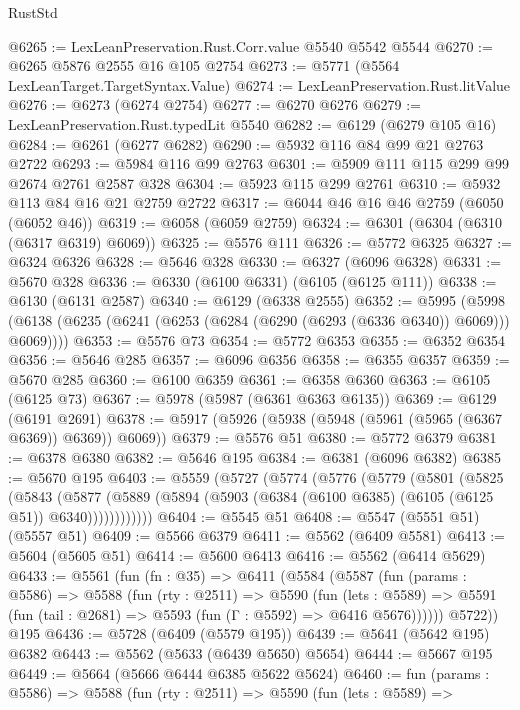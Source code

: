 \begin{lexlean}{RustStd}
\begin{coremodule}
{\begin{coremodule}
{{{{{{{{{{{{{{{{{{{{{{{{{{@6265 := LexLeanPreservation.Rust.Corr.value @5540 @5542 @5544
@6270 := @6265 @5876 @2555 @16 @105 @2754
@6273 := @5771 (@5564 LexLeanTarget.TargetSyntax.Value)
@6274 := LexLeanPreservation.Rust.litValue
@6276 := @6273 (@6274 @2754)
@6277 := @6270 @6276
@6279 := LexLeanPreservation.Rust.typedLit @5540
@6282 := @6129 (@6279 @105 @16)
@6284 := @6261 (@6277 @6282)
@6290 := @5932 @116 @84 @99 @21 @2763 @2722
@6293 := @5984 @116 @99 @2763
@6301 := @5909 @111 @115 @299 @99 @2674 @2761 @2587 @328
@6304 := @5923 @115 @299 @2761
@6310 := @5932 @113 @84 @16 @21 @2759 @2722
@6317 := @6044 @46 @16 @46 @2759 (@6050 (@6052 @46))
@6319 := @6058 (@6059 @2759)
@6324 := @6301 (@6304 (@6310 (@6317 @6319) @6069))
@6325 := @5576 @111
@6326 := @5772 @6325
@6327 := @6324 @6326
@6328 := @5646 @328
@6330 := @6327 (@6096 @6328)
@6331 := @5670 @328
@6336 := @6330 (@6100 @6331) (@6105 (@6125 @111))
@6338 := @6130 (@6131 @2587)
@6340 := @6129 (@6338 @2555)
@6352 := @5995
    (@5998 (@6138 (@6235 (@6241 (@6253 (@6284 (@6290 (@6293 (@6336 @6340)) @6069))) @6069))))
@6353 := @5576 @73
@6354 := @5772 @6353
@6355 := @6352 @6354
@6356 := @5646 @285
@6357 := @6096 @6356
@6358 := @6355 @6357
@6359 := @5670 @285
@6360 := @6100 @6359
@6361 := @6358 @6360
@6363 := @6105 (@6125 @73)
@6367 := @5978 (@5987 (@6361 @6363 @6135))
@6369 := @6129 (@6191 @2691)
@6378 := @5917 (@5926 (@5938 (@5948 (@5961 (@5965 (@6367 @6369)) @6369)) @6069))
@6379 := @5576 @51
@6380 := @5772 @6379
@6381 := @6378 @6380
@6382 := @5646 @195
@6384 := @6381 (@6096 @6382)
@6385 := @5670 @195
@6403 := @5559
    (@5727
      (@5774
        (@5776
          (@5779
            (@5801
              (@5825
                (@5843
                  (@5877
                    (@5889 (@5894 (@5903 (@6384 (@6100 @6385) (@6105 (@6125 @51)) @6340))))))))))))
@6404 := @5545 @51
@6408 := @5547 (@5551 @51) (@5557 @51)
@6409 := @5566 @6379
@6411 := @5562 (@6409 @5581)
@6413 := @5604 (@5605 @51)
@6414 := @5600 @6413
@6416 := @5562 (@6414 @5629)
@6433 := @5561
    (fun (fn : @35) =>
    @6411
      (@5584
        (@5587
          (fun (params : @5586) =>
          @5588
            (fun (rty : @2511) =>
            @5590
              (fun (lets : @5589) =>
              @5591 (fun (tail : @2681) => @5593 (fun (Γ : @5592) => @6416 @5676))))))
        @5722))
    @195
@6436 := @5728 (@6409 (@5579 @195))
@6439 := @5641 (@5642 @195) @6382
@6443 := @5562 (@5633 (@6439 @5650) @5654)
@6444 := @5667 @195
@6449 := @5664 (@5666 @6444 @6385 @5622 @5624)
@6460 := fun (params : @5586) =>
  @5588
    (fun (rty : @2511) =>
    @5590
      (fun (lets : @5589) =>
}}}}}}}}}}}}}}}}}}}}}}}}}}
\end{coremodule}}
\end{coremodule}
\end{lexlean}
